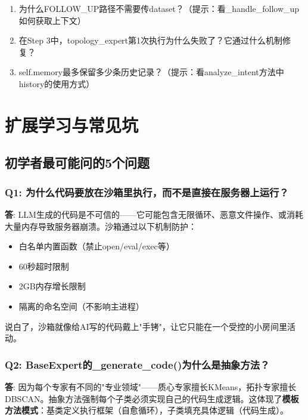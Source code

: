 \documentclass[11pt,a4paper]{ctexbook}
\begin{document}
\begin{reviewbox}
    \begin{enumerate}
        \item 为什么FOLLOW\_UP路径不需要传dataset？（提示：看\_handle\_follow\_up如何获取上下文）
        \item 在Step 3中，topology\_expert第1次执行为什么失败了？它通过什么机制修复？
        \item self.memory最多保留多少条历史记录？（提示：看analyze\_intent方法中history的使用方式）
    \end{enumerate}
\end{reviewbox}

\chapter{扩展学习与常见坑}

\section{初学者最可能问的5个问题}

\subsection{Q1: 为什么代码要放在沙箱里执行，而不是直接在服务器上运行？}

\textbf{答}: LLM生成的代码是不可信的——它可能包含无限循环、恶意文件操作、或消耗大量内存导致服务器崩溃。沙箱通过以下机制防护：
\begin{itemize}
    \item 白名单内置函数（禁止open/eval/exec等）
    \item 60秒超时限制
    \item 2GB内存增长限制
    \item 隔离的命名空间（不影响主进程）
\end{itemize}
说白了，沙箱就像给AI写的代码戴上"手铐"，让它只能在一个受控的小房间里活动。

\subsection{Q2: BaseExpert的\_generate\_code()为什么是抽象方法？}

\textbf{答}: 因为每个专家有不同的"专业领域"——质心专家擅长KMeans，拓扑专家擅长DBSCAN。抽象方法强制每个子类必须实现自己的代码生成逻辑。这体现了\textbf{模板方法模式}：基类定义执行框架（自愈循环），子类填充具体逻辑（代码生成）。
\end{document}

